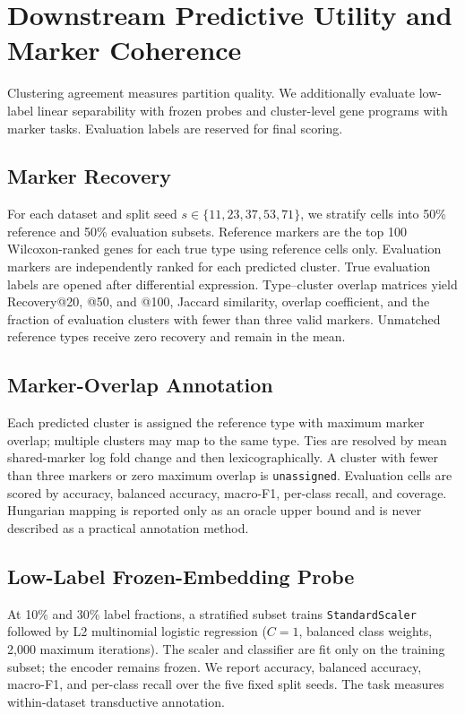 \section{Downstream Predictive Utility and Marker Coherence}
\label{sec:downstream}

Clustering agreement measures partition quality. We additionally evaluate
low-label linear separability with frozen probes and cluster-level gene programs
with marker tasks. Evaluation labels are reserved for final scoring.

\subsection{Marker Recovery}

For each dataset and split seed $s\in\{11,23,37,53,71\}$, we stratify cells into
50\% reference and 50\% evaluation subsets.  Reference markers are the top 100
Wilcoxon-ranked genes for each true type using reference cells only.  Evaluation
markers are independently ranked for each predicted cluster. True evaluation
labels are opened after differential expression. Type--cluster overlap matrices
yield Recovery@20, @50, and @100, Jaccard similarity, overlap coefficient, and
the fraction of evaluation clusters with fewer than three valid markers.
Unmatched reference types receive zero recovery and remain in the mean.

\subsection{Marker-Overlap Annotation}

Each predicted cluster is assigned the reference type with maximum marker
overlap; multiple clusters may map to the same type.  Ties are resolved by mean
shared-marker log fold change and then lexicographically.  A cluster with fewer
than three markers or zero maximum overlap is \texttt{unassigned}.  Evaluation
cells are scored by accuracy, balanced accuracy, macro-F1, per-class recall, and
coverage.  Hungarian mapping is reported only as an oracle upper bound and is
never described as a practical annotation method.

\subsection{Low-Label Frozen-Embedding Probe}

At 10\% and 30\% label fractions, a stratified subset trains
\texttt{StandardScaler} followed by L2 multinomial logistic regression
($C=1$, balanced class weights, 2,000 maximum iterations).  The scaler and
classifier are fit only on the training subset; the encoder remains frozen.
We report accuracy, balanced accuracy, macro-F1, and per-class recall over the
five fixed split seeds. The task measures within-dataset transductive
annotation.

